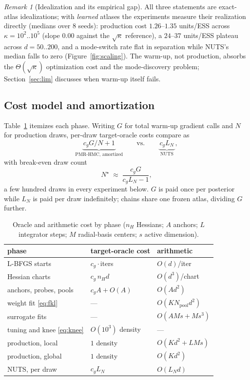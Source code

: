 \documentclass[11pt]{article}
\theoremstyle{remark}
\newtheorem{remark}{Remark}
\begin{document}
\begin{remark}[Idealization and its empirical gap]
All three statements are exact-atlas idealizations; with \emph{learned}
atlases the experiments measure their realization directly (medians over
8 seeds): production cost $1.26$--$1.35$ units/ESS across
$\kappa=10^2..10^5$ (slope $0.00$ against the $\sqrt\kappa$
reference), a $24$--$37$ units/ESS plateau across $d=50..200$, and a
mode-switch rate flat in separation while NUTS's median falls to zero
(Figure~\ref{fig:scaling}). The warm-up, not production,
absorbs the $\Theta(\sqrt\kappa)$ optimization cost and the
mode-discovery problem; Section~\ref{sec:lim} discusses when warm-up
itself fails.
\end{remark}

\subsection{Cost model and amortization}\label{sec:cost}
Table~\ref{tab:cost} itemizes each phase. Writing $G$ for total warm-up
gradient calls and $N$ for production draws, per-draw target-oracle
costs compare as
\begin{equation}
\underbrace{\,c_gG/N+1\,}_{\text{PMR-HMC, amortized}}
\qquad\text{vs.}\qquad
\underbrace{\,c_gL_N\,}_{\text{NUTS}},
\label{eq:amort}
\end{equation}
with break-even draw count
\begin{equation}
N^\star\;\approx\;\frac{c_gG}{c_gL_N-1},
\label{eq:breakeven}
\end{equation}
a few hundred draws in every experiment below. $G$ is paid once per
posterior while $L_N$ is paid per draw indefinitely; chains share one
frozen atlas, dividing $G$ further.

\begin{table}[t]
\caption{Oracle and arithmetic cost by phase ($n_H$ Hessians; $A$
anchors; $L$ integrator steps; $M$ radial-basis centers; $s$ active
dimension).}
\label{tab:cost}
\centering\small
\begin{tabular}{lll}
\toprule
phase & target-oracle cost & arithmetic\\
\midrule
L-BFGS starts & $c_g\cdot$iters & $O(d)$/iter\\
Hessian charts & $c_g\,n_Hd$ & $O(d^3)$/chart\\
anchors, probes, pools & $c_gA+O(A)$ & $O(Ad^2)$\\
weight fit \eqref{eq:fkl} & --- & $O(KN_{\mathrm{pool}}d^2)$\\
surrogate fits & --- & $O(AMs+Ms^3)$\\
tuning and knee \eqref{eq:knee} & $O(10^3)$ density & ---\\
\midrule
production, local & $1$ density & $O(Kd^2+LMs)$\\
production, global & $1$ density & $O(Kd^2)$\\
NUTS, per draw & $c_gL_N$ & $O(L_Nd)$\\
\bottomrule
\end{tabular}
\end{table}
\end{document}
